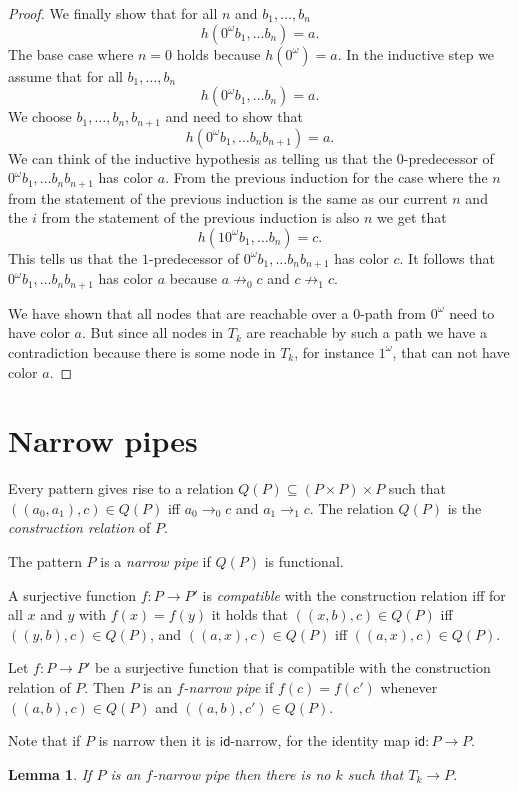 \documentclass[a4paper]{article}
\newtheorem{lemma}[theorem]{Lemma}
\begin{document}
\begin{proof}
\medskip

We finally show that for all $n$ and $b_1,\dots,b_n$
\[
 h(0^\omega b_1,\dots b_n) = a.
\]
The base case where $n = 0$ holds because $h(0^\omega) = a$.
In the inductive step we assume that for all $b_1,\dots,b_n$
\[
 h(0^\omega b_1,\dots b_n) = a.
\]
We choose $b_1,\dots,b_n,b_{n + 1}$ and need to show that
\[
 h(0^\omega b_1,\dots b_n b_{n + 1}) = a.
\]
We can think of the inductive hypothesis as telling us that the
$0$-predecessor of $0^\omega b_1,\dots b_n b_{n + 1}$ has color $a$.
From the previous induction for the case where the $n$ from the
statement of the previous induction is the same as our current $n$ and
the $i$ from the statement of the previous induction is also $n$ we get
that
\[
 h(1 0^\omega b_1,\dots b_n) = c.
\]
This tells us that the $1$-predecessor of $0^\omega b_1,\dots b_n b_{n +
1}$ has color $c$. It follows that $0^\omega b_1,\dots b_n b_{n +
1}$ has color $a$ because $a \not \rightarrow_0 c$ and $c \not
\rightarrow_1 c$.

\medskip

We have shown that all nodes that are reachable over a $0$-path from
$0^\omega$ need to have color $a$. But since all nodes in $T_k$ are
reachable by such a path we have a contradiction because there is some
node in $T_k$, for instance $1^\omega$, that can not have color $a$.
\end{proof}


\section{Narrow pipes}

Every pattern gives rise to a relation $Q(P) \subseteq (P \times P)
\times P$ such that $((a_0,a_1),c) \in Q(P)$ iff $a_0 \rightarrow_0 c$
and $a_1 \rightarrow_1 c$. The relation $Q(P)$ is the \emph{construction
relation} of $P$.

The pattern $P$ is a \emph{narrow pipe} if $Q(P)$ is functional.

A surjective function $f : P \to P'$ is \emph{compatible} with the
construction relation iff for all $x$ and $y$ with $f(x) = f(y)$ it
holds that $((x,b),c) \in Q(P)$ iff $((y,b),c) \in Q(P)$, and $((a,x),c)
\in Q(P)$ iff $((a,x),c) \in Q(P)$.

Let $f : P \to P'$ be a surjective function that is compatible with the
construction relation of $P$. Then $P$ is an \emph{$f$-narrow pipe} if
$f(c) = f(c')$ whenever $((a,b),c) \in Q(P)$ and $((a,b),c') \in Q(P)$.

Note that if $P$ is narrow then it is $\mathsf{id}$-narrow, for the
identity map $\mathsf{id} : P \to P$.

\begin{lemma} \label{killer lemma}
 If $P$ is an $f$-narrow pipe then there is no $k$ such that $T_k \to P$.
\end{lemma}
\end{document}
